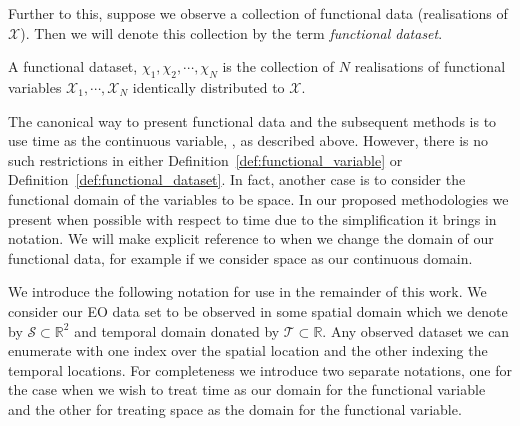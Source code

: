 Further to this, suppose we observe a collection of functional data (realisations of $\mathcal{X}$). Then we will denote this collection by the term \textit{functional dataset}.

\begin{definition}
	A functional dataset, $\chi_1, \chi_2, \cdots, \chi_N$ is the collection of $N$ realisations of functional variables $\mathcal{X}_1, \cdots, \mathcal{X}_N$ identically distributed to $\mathcal{X}$.
	\label{def:functional_dataset}
\end{definition}

The canonical way to present functional data and the subsequent methods is to use time as the continuous variable, \cite{ramsay_functional_2010, ferraty_nonparametric_2006, shi_gaussian_2011}, as described above. However, there is no such restrictions in either Definition~\ref{def:functional_variable} or Definition~\ref{def:functional_dataset}. In fact, another case is to consider the functional domain of the variables to be space. In our proposed methodologies we present when possible with respect to time due to the simplification it brings in notation. We will make explicit reference to when we change the domain of our functional data, for example if we consider space as our continuous domain. 

We introduce the following notation for use in the remainder of this work. We consider our EO data set to be observed in some spatial domain which we denote by $\mathcal{S} \subset \mathbb{R}^2$ and temporal domain donated by $\mathcal{T} \subset \mathbb{R}$. Any observed dataset we can enumerate with one index over the spatial location and the other indexing the temporal locations. For completeness we introduce two separate notations, one for the case when we wish to treat time as our domain for the functional variable and the other for treating space as the domain for the functional variable.

